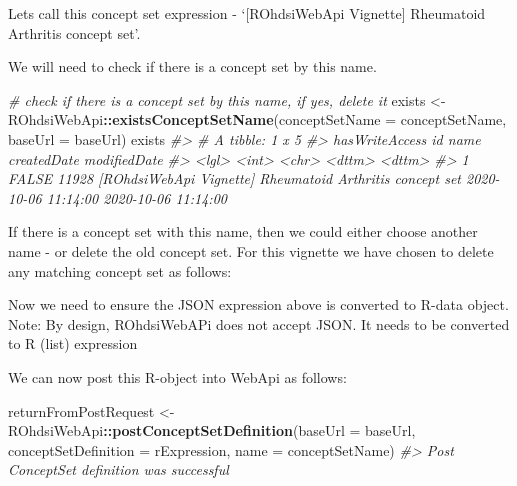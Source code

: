 \documentclass[
]{article}
\newenvironment{Shaded}{\begin{snugshade}}{\end{snugshade}}
\newcommand{\CommentTok}[1]{\textcolor[rgb]{0.56,0.35,0.01}{\textit{#1}}}
\newcommand{\ControlFlowTok}[1]{\textcolor[rgb]{0.13,0.29,0.53}{\textbf{#1}}}
\newcommand{\DataTypeTok}[1]{\textcolor[rgb]{0.13,0.29,0.53}{#1}}
\newcommand{\KeywordTok}[1]{\textcolor[rgb]{0.13,0.29,0.53}{\textbf{#1}}}
\newcommand{\NormalTok}[1]{#1}
\newcommand{\OperatorTok}[1]{\textcolor[rgb]{0.81,0.36,0.00}{\textbf{#1}}}
\newcommand{\StringTok}[1]{\textcolor[rgb]{0.31,0.60,0.02}{#1}}
\begin{document}
Lets call this concept set expression - `{[}ROhdsiWebApi Vignette{]}
Rheumatoid Arthritis concept set'.

We will need to check if there is a concept set by this name.

\begin{Shaded}
\begin{Highlighting}[]
\CommentTok{# check if there is a concept set by this name, if yes, delete it}
\NormalTok{exists <-}\StringTok{ }\NormalTok{ROhdsiWebApi}\OperatorTok{::}\KeywordTok{existsConceptSetName}\NormalTok{(}\DataTypeTok{conceptSetName =}\NormalTok{ conceptSetName, }\DataTypeTok{baseUrl =}\NormalTok{ baseUrl)}
\NormalTok{exists}
\CommentTok{#> # A tibble: 1 x 5}
\CommentTok{#>   hasWriteAccess    id name                                                     createdDate         modifiedDate       }
\CommentTok{#>   <lgl>          <int> <chr>                                                    <dttm>              <dttm>             }
\CommentTok{#> 1 FALSE          11928 [ROhdsiWebApi Vignette] Rheumatoid Arthritis concept set 2020-10-06 11:14:00 2020-10-06 11:14:00}
\end{Highlighting}
\end{Shaded}

If there is a concept set with this name, then we could either choose
another name - or delete the old concept set. For this vignette we have
chosen to delete any matching concept set as follows:

\begin{Shaded}
\end{Shaded}

Now we need to ensure the JSON expression above is converted to R-data
object. Note: By design, ROhdsiWebAPi does not accept JSON. It needs to
be converted to R (list) expression

We can now post this R-object into WebApi as follows:

\begin{Shaded}
\begin{Highlighting}[]
\NormalTok{returnFromPostRequest <-}\StringTok{ }\NormalTok{ROhdsiWebApi}\OperatorTok{::}\KeywordTok{postConceptSetDefinition}\NormalTok{(}\DataTypeTok{baseUrl =}\NormalTok{ baseUrl, }
                                                                \DataTypeTok{conceptSetDefinition =}\NormalTok{ rExpression, }
                                                                \DataTypeTok{name =}\NormalTok{ conceptSetName)}
\CommentTok{#> Post ConceptSet definition was successful}
\end{Highlighting}
\end{Shaded}
\end{document}
